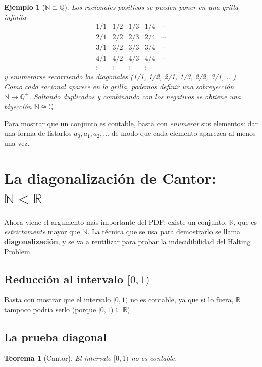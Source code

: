 \documentclass[11pt,a4paper]{article}
\theoremstyle{definicion}
\newtheorem{teorema}[definicion]{Teorema}
\newtheorem{ejemplo}[definicion]{Ejemplo}
\newcommand{\N}{\mathbb{N}}
\newcommand{\Q}{\mathbb{Q}}
\newcommand{\R}{\mathbb{R}}
\begin{document}
\begin{ejemplo}[$\N \cong \Q$]
Los racionales positivos se pueden poner en una grilla infinita
\[
\begin{array}{cccccc}
1/1 & 1/2 & 1/3 & 1/4 & \cdots \\
2/1 & 2/2 & 2/3 & 2/4 & \cdots \\
3/1 & 3/2 & 3/3 & 3/4 & \cdots \\
4/1 & 4/2 & 4/3 & 4/4 & \cdots \\
\vdots & \vdots & \vdots & \vdots
\end{array}
\]
y enumerarse recorriendo las diagonales (1/1, 1/2, 2/1, 1/3, 2/2, 3/1, ...). Como cada racional aparece en la grilla, podemos definir una sobreyección $\N \to \Q^+$. Saltando duplicados y combinando con los negativos se obtiene una biyección $\N \cong \Q$.
\end{ejemplo}

\begin{idea}
Para mostrar que un conjunto es contable, basta con \emph{enumerar} sus elementos: dar una forma de listarlos $a_0, a_1, a_2, \dots$ de modo que cada elemento aparezca al menos una vez.
\end{idea}

\section{La diagonalización de Cantor: \texorpdfstring{$\N < \R$}{N < R}}

Ahora viene el argumento más importante del PDF: existe un conjunto, $\R$, que es \emph{estrictamente} mayor que $\N$. La técnica que se usa para demostrarlo se llama \textbf{diagonalización}, y se va a reutilizar para probar la indecidibilidad del Halting Problem.

\subsection{Reducción al intervalo $[0, 1)$}

Basta con mostrar que el intervalo $[0, 1)$ no es contable, ya que si lo fuera, $\R$ tampoco podría serlo (porque $[0,1) \subseteq \R$).

\subsection{La prueba diagonal}

\begin{teorema}[Cantor]
El intervalo $[0, 1)$ no es contable.
\end{teorema}
\end{document}
